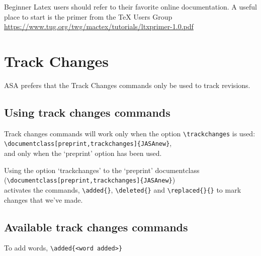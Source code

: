 \documentclass[preprint,trackchanges]{JASAnew}
\begin{document}
  Beginner Latex users should refer to their favorite online documentation. A 
  useful place to start is the primer from the TeX Users Group 
  \url{https://www.tug.org/twg/mactex/tutorials/ltxprimer-1.0.pdf}







\section{Track Changes}
ASA prefers that the Track Changes commands only be used to
track revisions.

\subsection{Using track changes commands}
Track changes commands will work only when the option
\verb+\trackchanges+ is used:\\
\verb+\documentclass[preprint,trackchanges]{JASAnew}+,\\
and only when the `preprint' option has been used.

Using the option `trackchanges' to the `preprint' documentclass\\
(\verb+\documentclass[preprint,trackchanges]{JASAnew}+)\\
activates the commands, \verb+\added{}+, \verb+\deleted{}+
and \verb+\replaced{}{}+ to mark changes that we've made.

\subsection{Available track changes commands}

To add words, \verb+\added{<word added>}+
\end{document}
